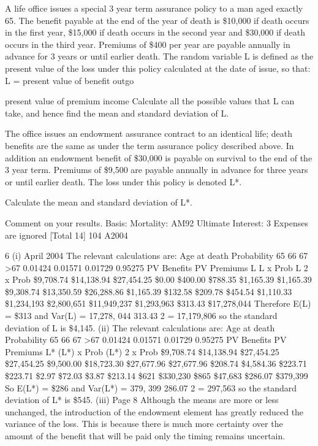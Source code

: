 \documentclass[a4paper,12pt]{article}
\begin{document}
A life office issues a special 3 year term assurance policy to a man aged exactly 65.
The benefit payable at the end of the year of death is \$10,000 if death occurs in the
first year, \$15,000 if death occurs in the second year and \$30,000 if death occurs in
the third year. Premiums of \$400 per year are payable annually in advance for 3 years
or until earlier death. The random variable L is defined as the present value of the
loss under this policy calculated at the date of issue, so that:
L = present value of benefit outgo
\item 
present value of premium income
Calculate all the possible values that L can take, and hence find the mean and
standard deviation of L.

The office issues an endowment assurance contract to an identical life; death benefits
are the same as under the term assurance policy described above. In addition an
endowment benefit of \$30,000 is payable on survival to the end of the 3 year term.
Premiums of \$9,500 are payable annually in advance for three years or until earlier
death. The loss under this policy is denoted L*.
\item  Calculate the mean and standard deviation of L*. 
\item  Comment on your results. 
Basis: Mortality: AM92 Ultimate
Interest: 3%
Expenses are ignored
[Total 14]
104 A2004


6
(i)
April 2004
The relevant calculations are:
Age at
death Probability
65
66
67
>67 0.01424
0.01571
0.01729
0.95275
PV
Benefits PV
Premiums L L x Prob L 2 x Prob
\$9,708.74
\$14,138.94
\$27,454.25
\$0.00 \$400.00
\$788.35
\$1,165.39
\$1,165.39 \$9,308.74
\$13,350.59
\$26,288.86
\$1,165.39 \$132.58
\$209.78
\$454.54
\$1,110.33 \$1,234,193
\$2,800,651
\$11,949,237
\$1,293,963
\$313.43 \$17,278,044
Therefore E(L) = \$313
and
Var(L) = 17,278, 044 313.43 2
= 17,179,806
so the standard deviation of L is \$4,145.
(ii)
The relevant calculations are:
Age at
death Probability
65
66
67
>67 0.01424
0.01571
0.01729
0.95275
PV
Benefits PV
Premiums L* (L*) x Prob (L*) 2 x Prob
\$9,708.74
\$14,138.94
\$27,454.25
\$27,454.25 \$9,500.00
\$18,723.30
\$27,677.96
\$27,677.96 \$208.74
\$4,584.36
\$223.71
\$223.71 \$2.97
\$72.03
\$3.87
\$213.14 \$621
\$330,230
\$865
\$47,683
\$286.07 \$379,399
So E(L*) = \$286
and
Var(L*) = 379, 399 286.07 2
= 297,563
so the standard deviation of L* is \$545.
(iii)
Page 8
Although the means are more or less unchanged, the introduction of the
endowment element has greatly reduced the variance of the loss. This is
because there is much more certainty over the amount of the benefit that will
be paid
only the timing remains uncertain. %
\end{document}
